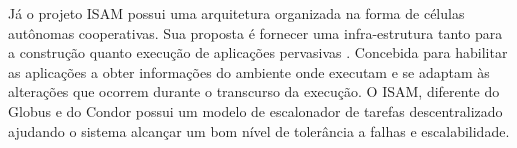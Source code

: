 Já o projeto ISAM \cite{isam} possui uma arquitetura organizada na forma de células autônomas cooperativas. Sua proposta é fornecer uma infra-estrutura tanto para a construção quanto execução de aplicações pervasivas \cite {isam}. Concebida para habilitar as aplicações a obter informações do ambiente onde executam e se adaptam às alterações que ocorrem durante o transcurso da execução. O ISAM, diferente do Globus e do Condor possui um modelo de escalonador de tarefas descentralizado ajudando o sistema alcançar um bom nível de tolerância a falhas e escalabilidade.
